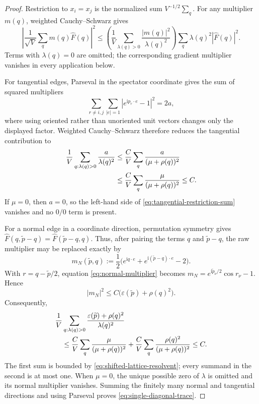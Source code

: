 \documentclass[11pt]{article}
\numberwithin{equation}{section}
\theoremstyle{remark}
\newcommand{\1}{\mathbf 1}
\begin{document}
\begin{proof}
Restriction to \(x_i=x_j\) is the normalized sum
\(V^{-1/2}\sum_q\).  For any multiplier \(m(q)\), weighted
Cauchy--Schwarz gives
\begin{equation}
 \left|\frac1{\sqrt V}\sum_qm(q)\widehat F(q)\right|^2
 \leq
 \left(\frac1V\sum_{\lambda(q)>0}
 \frac{|m(q)|^2}{\lambda(q)^2}\right)
 \sum_q\lambda(q)^2|\widehat F(q)|^2.
 \label{eq:weighted-restriction-cs}
\end{equation}
Terms with \(\lambda(q)=0\) are omitted; the corresponding gradient
multiplier vanishes in every application below.

For tangential edges, Parseval in the spectator coordinate gives the sum
of squared multipliers
\[
 \sum_{r\ne i,j}\sum_{|e|=1}
 |e^{\mathrm i p_r\cdot e}-1|^2=2a,
\]
where using oriented rather than unoriented unit vectors changes only the
displayed factor.  Weighted Cauchy--Schwarz therefore reduces
the tangential contribution to
\begin{align}
 \frac1V\sum_{q:\lambda(q)>0}\frac{a}{\lambda(q)^2}
 &\leq \frac C V\sum_q\frac{a}{(\mu+\rho(q))^2} \notag\\
 &\leq \frac C V\sum_q\frac{\mu}{(\mu+\rho(q))^2}
 \leq C.
 \label{eq:tangential-restriction-sum}
\end{align}
If \(\mu=0\), then \(a=0\), so the left-hand side of
\eqref{eq:tangential-restriction-sum} vanishes and no \(0/0\) term is
present.

For a normal edge in a coordinate direction, permutation symmetry gives
\(\widehat F(q,\widetilde p-q)=
  \widehat F(\widetilde p-q,q)\).  Thus, after pairing the terms
\(q\) and \(\widetilde p-q\), the raw multiplier may be replaced exactly
by
\begin{equation}
 m_N(\widetilde p,q)
 :=\frac12\bigl(e^{\mathrm iq\cdot e}
 +e^{\mathrm i(\widetilde p-q)\cdot e}-2\bigr).
 \label{eq:normal-multiplier}
\end{equation}
With \(r=q-\widetilde p/2\), equation \eqref{eq:normal-multiplier} becomes
\(m_N=e^{\mathrm i\widetilde p_\nu/2}\cos r_\nu-1\).  Hence
\[
 |m_N|^2
 \leq C\bigl(\varepsilon(\widetilde p)+\rho(q)^2\bigr).
\]
Consequently,
\begin{align}
 &\frac1V\sum_{q:\lambda(q)>0}
 \frac{\varepsilon(\widetilde p)+\rho(q)^2}{\lambda(q)^2}
 \notag\\
 &\quad\leq
 \frac C V\sum_q\frac{\mu}{(\mu+\rho(q))^2}
 +\frac C V\sum_q\frac{\rho(q)^2}{(\mu+\rho(q))^2}
 \leq C.
 \label{eq:normal-restriction-sum}
\end{align}
The first sum is bounded by \eqref{eq:shifted-lattice-resolvent}; every
summand in the second is at most one.  When \(\mu=0\), the unique possible
zero of \(\lambda\) is omitted and its normal multiplier vanishes.
Summing the finitely many normal and tangential directions and using
Parseval proves \eqref{eq:single-diagonal-trace}.
\end{proof}
\end{document}
